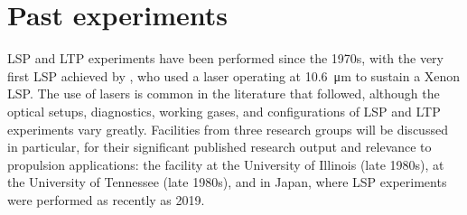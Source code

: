     \section{Past experiments} \label{sec:background_exp}
        LSP and LTP experiments have been performed since the 1970s, with the very first LSP achieved by \textcite{generalovContinuousOpticalDischarge1970}, who used a  laser operating at \qty{10.6}{\um} to sustain a Xenon LSP. The use of  lasers is common in the literature that followed, although the optical setups, diagnostics, working gases, and configurations of LSP and LTP experiments vary greatly. Facilities from three research groups will be discussed in particular, for their significant published research output and relevance to propulsion applications: the facility at the University of Illinois (late 1980s), at the University of Tennessee (late 1980s), and in Japan, where LSP experiments were performed as recently as 2019. 

